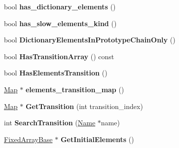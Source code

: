 \begin{DoxyCompactItemize}
\item 
\hypertarget{classv8_1_1internal_1_1_map_a4e365f3328d1b293a4740a50664d2e97}{}bool {\bfseries has\+\_\+dictionary\+\_\+elements} ()\label{classv8_1_1internal_1_1_map_a4e365f3328d1b293a4740a50664d2e97}

\item 
\hypertarget{classv8_1_1internal_1_1_map_afc42aeafaf31adad5b96767a5d595aed}{}bool {\bfseries has\+\_\+slow\+\_\+elements\+\_\+kind} ()\label{classv8_1_1internal_1_1_map_afc42aeafaf31adad5b96767a5d595aed}

\item 
\hypertarget{classv8_1_1internal_1_1_map_ae66155e036a9380fcf567bf79b3abfce}{}bool {\bfseries Dictionary\+Elements\+In\+Prototype\+Chain\+Only} ()\label{classv8_1_1internal_1_1_map_ae66155e036a9380fcf567bf79b3abfce}

\item 
\hypertarget{classv8_1_1internal_1_1_map_ade1723b8c501516e143ac7f6a0d1d30f}{}bool {\bfseries Has\+Transition\+Array} () const \label{classv8_1_1internal_1_1_map_ade1723b8c501516e143ac7f6a0d1d30f}

\item 
\hypertarget{classv8_1_1internal_1_1_map_a2419af7e4780e87141f8494566e63e26}{}bool {\bfseries Has\+Elements\+Transition} ()\label{classv8_1_1internal_1_1_map_a2419af7e4780e87141f8494566e63e26}

\item 
\hypertarget{classv8_1_1internal_1_1_map_a1ec6b5ce6d6afd460f7e930bef04b54a}{}\hyperlink{classv8_1_1internal_1_1_map}{Map} $\ast$ {\bfseries elements\+\_\+transition\+\_\+map} ()\label{classv8_1_1internal_1_1_map_a1ec6b5ce6d6afd460f7e930bef04b54a}

\item 
\hypertarget{classv8_1_1internal_1_1_map_a37f5e0af8df282dfbca9ceb0bcc410ed}{}\hyperlink{classv8_1_1internal_1_1_map}{Map} $\ast$ {\bfseries Get\+Transition} (int transition\+\_\+index)\label{classv8_1_1internal_1_1_map_a37f5e0af8df282dfbca9ceb0bcc410ed}

\item 
\hypertarget{classv8_1_1internal_1_1_map_ae79f3556564944d76cc60eb34bd45bd2}{}int {\bfseries Search\+Transition} (\hyperlink{classv8_1_1internal_1_1_name}{Name} $\ast$name)\label{classv8_1_1internal_1_1_map_ae79f3556564944d76cc60eb34bd45bd2}

\item 
\hypertarget{classv8_1_1internal_1_1_map_a9db82c1c9a9a68745acc5adac4b69ca1}{}\hyperlink{classv8_1_1internal_1_1_fixed_array_base}{Fixed\+Array\+Base} $\ast$ {\bfseries Get\+Initial\+Elements} ()\label{classv8_1_1internal_1_1_map_a9db82c1c9a9a68745acc5adac4b69ca1}


\end{DoxyCompactItemize}
